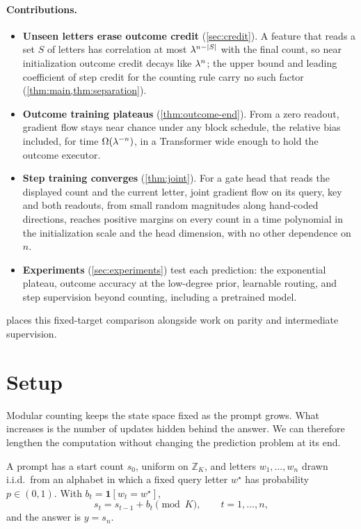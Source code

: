 \paragraph{Contributions.}
\begin{itemize}[leftmargin=*,itemsep=2pt,topsep=3pt]
\item \textbf{Unseen letters erase outcome credit} (\cref{sec:credit}). A feature that reads a set $S$ of letters has correlation at most
$\lambda^{n-|S|}$ with the final count, so near initialization outcome credit decays like $\lambda^n$; the upper bound and leading coefficient of
step credit for the counting rule carry no such factor (\cref{thm:main,thm:separation}).
\item \textbf{Outcome training plateaus} (\cref{thm:outcome-end}). From a zero readout, gradient flow stays near chance under any block schedule, the relative bias included,
for time $\Omega(\lambda^{-n})$, in a Transformer wide enough to hold the outcome executor.
\item \textbf{Step training converges} (\cref{thm:joint}). For a gate head that reads the displayed count and the current
letter, joint gradient flow on its query, key and both readouts, from small random magnitudes along hand-coded directions,
reaches positive margins on every count in a time polynomial in the initialization scale and the head dimension, with no other dependence on $n$.
\item \textbf{Experiments} (\cref{sec:experiments}) test each prediction: the exponential plateau, outcome accuracy at the
low-degree prior, learnable routing, and step supervision beyond counting, including a pretrained model.
\end{itemize}

 places this fixed-target comparison alongside work on parity and intermediate supervision.

\section{Setup}
\label{sec:setup}
\label{sec:setting}

Modular counting keeps the state space fixed as the prompt grows. What increases is the number of updates hidden behind the
answer. We can therefore lengthen the computation without changing the prediction problem at its end.

\begin{definition}
\label{def:task}
A prompt has a start count $s_0$, uniform on $\mathbb Z_K$, and letters $w_1,\ldots,w_n$ drawn i.i.d.\ from an alphabet
in which a fixed query letter $w^\star$ has probability $p\in(0,1)$. With $b_t=\mathbf 1[w_t=w^\star]$,
\begin{equation}
 s_t=s_{t-1}+b_t\pmod K,\qquad t=1,\ldots,n,
 \label{eq:tracking}
\end{equation}
and the answer is $y=s_n$.
\end{definition}

